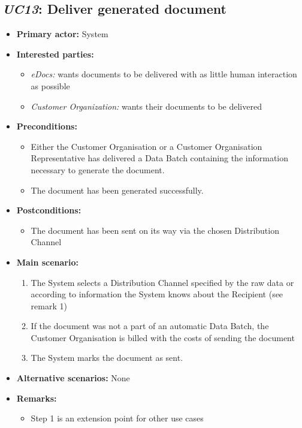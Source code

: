 \documentclass[a4paper,10pt]{article}
\begin{document}
\subsection{\emph{UC13}: Deliver generated document}
\begin{itemize}
    \item \textbf{Primary actor:} System
    \item \textbf{Interested parties:} 
        \begin{itemize}
            \item \textit{eDocs:} wants documents to be delivered with as little human interaction as possible
            \item \textit{Customer Organization:} wants their documents to be delivered
        \end{itemize}

    \item \textbf{Preconditions:}
        \begin{itemize}
            \item Either the Customer Organisation or a Customer Organisation Representative has delivered a Data Batch containing the information necessary to generate the document.
            \item The document has been generated successfully.
        \end{itemize}

    \item \textbf{Postconditions:}
        \begin{itemize}
            \item The document has been sent on its way via the chosen Distribution Channel
        \end{itemize}
        
    \item \textbf{Main scenario:} 
    \begin{enumerate}
       \item The System selects a Distribution Channel specified by the raw data or according to information the System knows about the Recipient (see remark 1)
       \item If the document was not a part of an automatic Data Batch, the Customer Organisation is billed with the costs of sending the document
       \item The System marks the document as sent.
    \end{enumerate}

    \item \textbf{Alternative scenarios:} 
    None
    
    \item \textbf{Remarks:}
        \begin{itemize}
            \item Step 1 is an extension point for other use cases
        \end{itemize}
\end{itemize}
\end{document}
